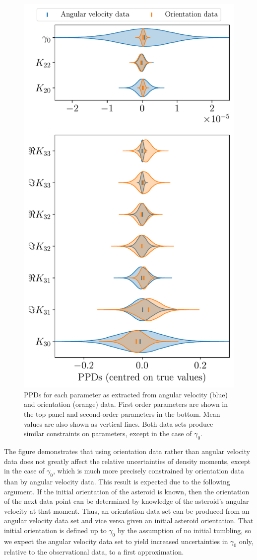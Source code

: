 \documentclass[fleqn,usenatbib]{mnras}
\begin{document}
\begin{figure}
  \centering
  \includegraphics[width=0.7\linewidth]{figs/orientation-unc}
  \caption{PPDs for each parameter as extracted from angular velocity (blue) and orientation (orange) data. First order parameters are shown in the top panel and second-order parameters in the bottom. Mean values are also shown as vertical lines. Both data sets produce similar constraints on parameters, except in the case of $\gamma_0$.}
  \label{fig:orientation-unc}
\end{figure}

The figure demonstrates that using orientation data rather than angular velocity data does not greatly affect the relative uncertainties of density moments, except in the case of $\gamma_0$, which is much more precisely constrained by orientation data than by angular velocity data. This result is expected due to the following argument. If the initial orientation of the asteroid is known, then the orientation of the next data point can be determined by knowledge of the asteroid's angular velocity at that moment. Thus, an orientation data set can be produced from an angular velocity data set and vice versa given an initial asteroid orientation. That initial orientation is defined up to $\gamma_0$ by the assumption of no initial tumbling, so we expect the angular velocity data set to yield increased uncertainties in $\gamma_0$ only, relative to the observational data, to a first approximation.
\end{document}
